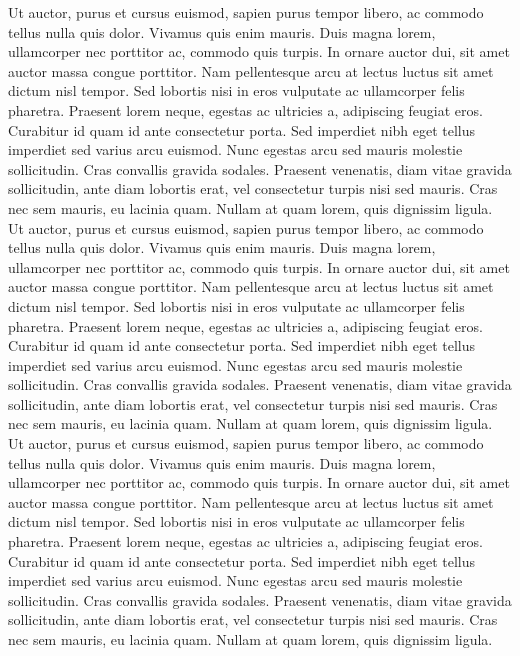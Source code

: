 Ut auctor, purus et cursus euismod, sapien purus tempor libero, ac commodo tellus nulla quis dolor. Vivamus quis enim mauris. Duis magna lorem, ullamcorper nec porttitor ac, commodo quis turpis. In ornare auctor dui, sit amet auctor massa congue porttitor. Nam pellentesque arcu at lectus luctus sit amet dictum nisl tempor. Sed lobortis nisi in eros vulputate ac ullamcorper felis pharetra. Praesent lorem neque, egestas ac ultricies a, adipiscing feugiat eros. Curabitur id quam id ante consectetur porta. Sed imperdiet nibh eget tellus imperdiet sed varius arcu euismod. Nunc egestas arcu sed mauris molestie sollicitudin. Cras convallis gravida sodales. Praesent venenatis, diam vitae gravida sollicitudin, ante diam lobortis erat, vel consectetur turpis nisi sed mauris. Cras nec sem mauris, eu lacinia quam. Nullam at quam lorem, quis dignissim ligula.
Ut auctor, purus et cursus euismod, sapien purus tempor libero, ac commodo tellus nulla quis dolor. Vivamus quis enim mauris. Duis magna lorem, ullamcorper nec porttitor ac, commodo quis turpis. In ornare auctor dui, sit amet auctor massa congue porttitor. Nam pellentesque arcu at lectus luctus sit amet dictum nisl tempor. Sed lobortis nisi in eros vulputate ac ullamcorper felis pharetra. Praesent lorem neque, egestas ac ultricies a, adipiscing feugiat eros. Curabitur id quam id ante consectetur porta. Sed imperdiet nibh eget tellus imperdiet sed varius arcu euismod. Nunc egestas arcu sed mauris molestie sollicitudin. Cras convallis gravida sodales. Praesent venenatis, diam vitae gravida sollicitudin, ante diam lobortis erat, vel consectetur turpis nisi sed mauris. Cras nec sem mauris, eu lacinia quam. Nullam at quam lorem, quis dignissim ligula.
Ut auctor, purus et cursus euismod, sapien purus tempor libero, ac commodo tellus nulla quis dolor. Vivamus quis enim mauris. Duis magna lorem, ullamcorper nec porttitor ac, commodo quis turpis. In ornare auctor dui, sit amet auctor massa congue porttitor. Nam pellentesque arcu at lectus luctus sit amet dictum nisl tempor. Sed lobortis nisi in eros vulputate ac ullamcorper felis pharetra. Praesent lorem neque, egestas ac ultricies a, adipiscing feugiat eros. Curabitur id quam id ante consectetur porta. Sed imperdiet nibh eget tellus imperdiet sed varius arcu euismod. Nunc egestas arcu sed mauris molestie sollicitudin. Cras convallis gravida sodales. Praesent venenatis, diam vitae gravida sollicitudin, ante diam lobortis erat, vel consectetur turpis nisi sed mauris. Cras nec sem mauris, eu lacinia quam. Nullam at quam lorem, quis dignissim ligula.
